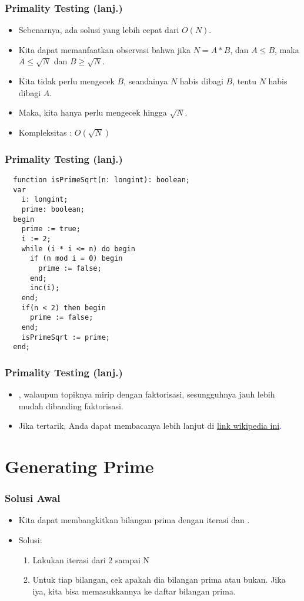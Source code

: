 \begin{frame}
\frametitle{Primality Testing (lanj.)}
\begin{itemize}
  \item Sebenarnya, ada solusi yang lebih cepat dari $O(N)$.
  \item Kita dapat memanfaatkan observasi bahwa jika $N = A*B$, dan $A \leq B$, maka $A \leq \sqrt{N}$ dan $B \geq \sqrt{N}$.
  \item Kita tidak perlu mengecek $B$, seandainya $N$ habis dibagi $B$, tentu $N$ habis dibagi $A$.
  \item Maka, kita hanya perlu mengecek hingga $\sqrt{N}$.
  \item Kompleksitas : $O(\sqrt{N})$
\end{itemize}
\end{frame}

\begin{frame}[fragile]
\frametitle{Primality Testing (lanj.)}
\begin{lstlisting}
  function isPrimeSqrt(n: longint): boolean;
  var
    i: longint;
    prime: boolean;
  begin
    prime := true;
    i := 2;
    while (i * i <= n) do begin
      if (n mod i = 0) begin
        prime := false;
      end;
      inc(i);
    end;
    if(n < 2) then begin
      prime := false;
    end;
    isPrimeSqrt := prime;
  end;  
\end{lstlisting}
\end{frame}

\begin{frame}
\frametitle{Primality Testing (lanj.)}
\begin{itemize}
  \item {}, walaupun topiknya mirip dengan faktorisasi, sesungguhnya jauh lebih mudah dibanding faktorisasi.
  \item Jika tertarik, Anda dapat membacanya lebih lanjut di \textcolor{blue}{\href{https://en.wikipedia.org/wiki/Primality_test}{link wikipedia ini}.} 
\end{itemize}
\end{frame}

\section{Generating Prime}
\frame{\sectionpage}

\begin{frame}
\frametitle{Solusi Awal}
\begin{itemize}
  \item Kita dapat membangkitkan bilangan prima dengan iterasi dan .
  \item Solusi: 
  \begin{enumerate}
    \item Lakukan iterasi dari 2 sampai N
    \item Untuk tiap bilangan, cek apakah dia bilangan prima atau bukan. Jika iya, kita bisa memasukkannya ke daftar bilangan prima.
  \end{enumerate}
\end{itemize}
\end{frame}

